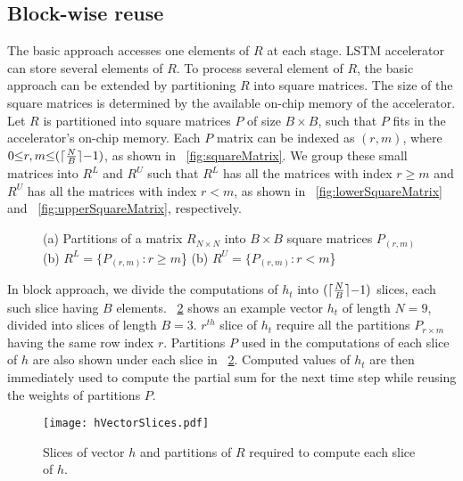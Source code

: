 \subsection{Block-wise reuse}
The basic approach accesses one elements of $R$ at each stage. LSTM accelerator can store several elements of $R$. To process several element of $R$, the basic approach can be extended by partitioning $R$ into square matrices. The size of the square matrices is determined by the available on-chip memory of the accelerator. Let $R$ is partitioned into square matrices $P$ of size $B{\times}B$, such that $P$ fits in the accelerator's on-chip memory. Each $P$ matrix can be indexed as $(r,m)$, where $0{\le}r,m{\le} (\lceil\frac{N}{B}\rceil{-}1)$, as shown in \figurename{~\ref{fig:squareMatrix}}. We group these small matrices into $R^L$ and $R^U$ such that $R^L$ has all the matrices with index $r{\geq}m$  and $R^U$ has all the matrices with index $r{<}m$, as shown in \figurename{~\ref{fig:lowerSquareMatrix}} and \figurename{~\ref{fig:upperSquareMatrix}}, respectively.
\begin{figure}[htb!]
	\centering
	\caption{(a) Partitions of a matrix $R_{N{\times}N}$ into $B{\times}B$ square matrices $P_{(r,m)}$ (b) $R^L{=}\{P_{(r,m)}:r{\geq}m$\} (b) $R^U{=}\{P_{(r,m)}:r{<}m$\}	}
	\label{fig:SquareMatrices}
	\vspace{-1.0em}	
\end{figure} 

In block approach, we divide the computations of $h_t$ into $(\lceil\frac{N}{B}\rceil{-}1)$ slices, each such slice having $B$ elements. \figurename{~\ref{fig:hVectorSlices}} shows an example vector $h_t$ of length $N{=}9$, divided into slices of length $B{=}3$. $r^{th}$ slice of $h_t$ require all the partitions $P_{r{\times}m}$ having the same row index $r$. Partitions $P$ used in the computations of each slice of $h$ are also shown under each slice in \figurename{~\ref{fig:hVectorSlices}}. Computed values of $h_t$ are then immediately used to compute the partial sum for the next time step while reusing the weights of partitions $P$.  
\begin{figure}[!htb]
	\centerline{\texttt{[image: hVectorSlices.pdf]}}
	\caption{Slices of vector $h$ and partitions of $R$ required to compute each slice of $h$.}
	\label{fig:hVectorSlices}
	\vspace{-1.0em}	
\end{figure}

